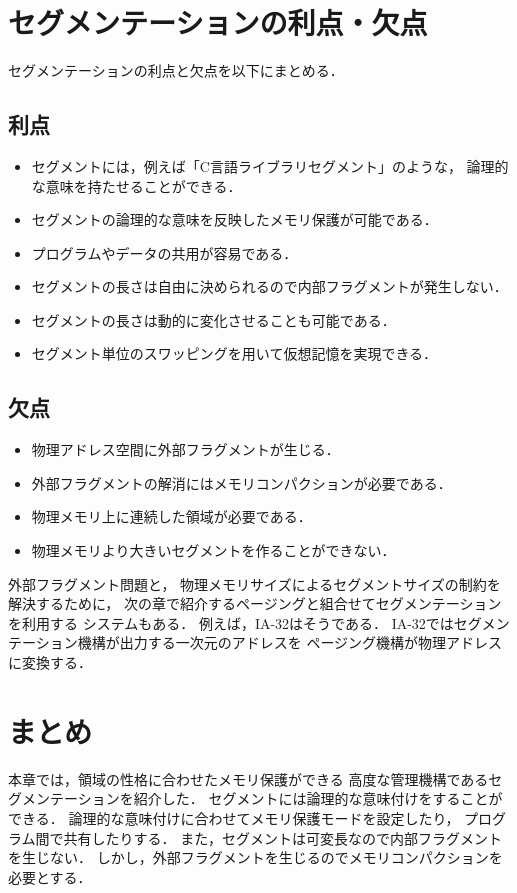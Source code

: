 \section{セグメンテーションの利点・欠点}
セグメンテーションの利点と欠点を以下にまとめる．

\subsection*{利点}
\begin{itemize}
\item セグメントには，例えば「C言語ライブラリセグメント」のような，
  論理的な意味を持たせることができる．
\item セグメントの論理的な意味を反映したメモリ保護が可能である．
\item プログラムやデータの共用が容易である．
\item セグメントの長さは自由に決められるので内部フラグメントが発生しない．
\item セグメントの長さは動的に変化させることも可能である．
\item セグメント単位のスワッピングを用いて仮想記憶を実現できる．
\end{itemize}

\subsection*{欠点}
\begin{itemize}
\item 物理アドレス空間に外部フラグメントが生じる．
\item 外部フラグメントの解消にはメモリコンパクションが必要である．
\item 物理メモリ上に連続した領域が必要である．
\item 物理メモリより大きいセグメントを作ることができない．
\end{itemize}

外部フラグメント問題と，
物理メモリサイズによるセグメントサイズの制約を解決するために，
次の章で紹介するページングと組合せてセグメンテーションを利用する
システムもある．
例えば，IA-32はそうである．
IA-32ではセグメンテーション機構が出力する一次元のアドレスを
ページング機構が物理アドレスに変換する．

\section{まとめ}
本章では，領域の性格に合わせたメモリ保護ができる
高度な管理機構であるセグメンテーションを紹介した．
セグメントには論理的な意味付けをすることができる．
論理的な意味付けに合わせてメモリ保護モードを設定したり，
プログラム間で共有したりする．
また，セグメントは可変長なので内部フラグメントを生じない．
しかし，外部フラグメントを生じるのでメモリコンパクションを必要とする．


